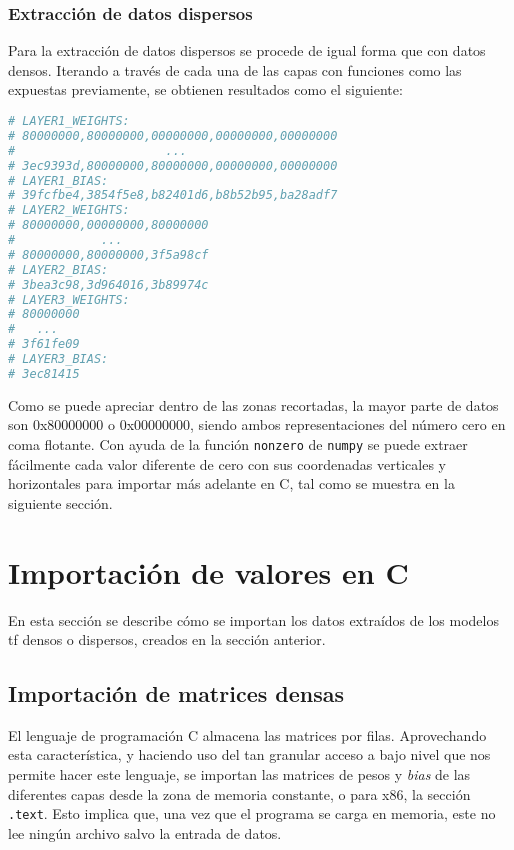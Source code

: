 \subsubsection{Extracción de datos dispersos}
\label{sssec:extraccion_datos_dispersos}
Para la extracción de datos dispersos se procede de igual forma que con datos densos. Iterando a través de cada una de las capas con funciones como las expuestas previamente, se obtienen resultados como el siguiente:\medskip
\begin{lstlisting}[language=Python]
# LAYER1_WEIGHTS:
# 80000000,80000000,00000000,00000000,00000000
#                     ...
# 3ec9393d,80000000,80000000,00000000,00000000
# LAYER1_BIAS:
# 39fcfbe4,3854f5e8,b82401d6,b8b52b95,ba28adf7
# LAYER2_WEIGHTS:
# 80000000,00000000,80000000
#            ...
# 80000000,80000000,3f5a98cf
# LAYER2_BIAS:
# 3bea3c98,3d964016,3b89974c
# LAYER3_WEIGHTS:
# 80000000
#   ...
# 3f61fe09
# LAYER3_BIAS:
# 3ec81415    
\end{lstlisting}

Como se puede apreciar dentro de las zonas recortadas, la mayor parte de datos son 0x80000000 o 0x00000000, siendo ambos representaciones del número cero en coma flotante. Con ayuda de la función \texttt{nonzero} de \texttt{numpy} se puede extraer fácilmente cada valor diferente de cero con sus coordenadas verticales y horizontales para importar más adelante en C, tal como se muestra en la siguiente sección.

\section{Importación de valores en C}
\label{sec:importacion_valores_c}
En esta sección se describe cómo se importan los datos extraídos de los modelos \acrshort{tf} densos o dispersos, creados en la sección anterior.

\subsection{Importación de matrices densas}
\label{ssec:importacion_matrices_densas}
El lenguaje de programación C almacena las matrices por filas. Aprovechando esta característica, y haciendo uso del tan granular acceso a bajo nivel que nos permite hacer este lenguaje, se importan las matrices de pesos y \textit{bias} de las diferentes capas desde la zona de memoria constante, o para x86, la sección \texttt{.text}. Esto implica que, una vez que el programa se carga en memoria, este no lee ningún archivo salvo la entrada de datos.


